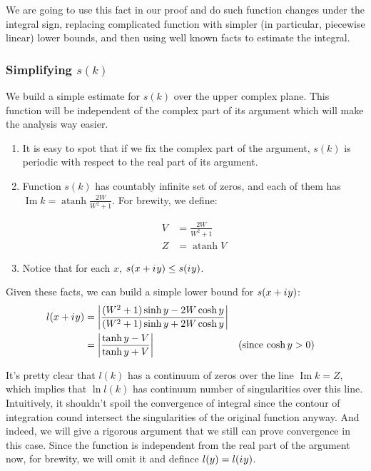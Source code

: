 \documentclass{gCOV2e}
\theoremstyle{plain}%
\theoremstyle{definition}
\theoremstyle{remark}
\newcommand{\iu}{{i\mkern1mu}} %
\renewcommand{\Im}{\operatorname{Im}}
\newcommand\abs[1]{\left|#1\right|}
\DeclareMathOperator\atanh{atanh}
\begin{document}
We are going to use this fact in our proof and do such function changes under the integral sign, replacing complicated function with simpler (in particular, piecewise linear) lower bounds, and then using well known facts to estimate the integral.

\subsubsection{Simplifying $s(k)$}
We build a simple estimate for $s(k)$ over the upper complex plane. This function will be independent of the complex part of its argument which will make the analysis way easier.

\begin{enumerate}
\item
  It is easy to spot that if we fix the complex part of the argument, $s(k)$ is periodic with respect to the real part of its argument.
\item 
  Function $s(k)$ has countably infinite set of zeros, and each of them has $\Im k = \atanh \frac{2 W}{W^2 + 1}$. For brewity, we define:

  \begin{equation*}
  \begin{aligned}
     V &= \frac{2 W}{W^2 + 1}
  \\ Z &= \atanh V
  \end{aligned}
  \end{equation*}
\item
  Notice that for each $x$, $s(x + \iu y) \le s(\iu y)$.
\end{enumerate}

Given these facts, we can build a simple lower bound for $s(x + \iu y)$:
\begin{align*}
l(x + \iu y)
   &= \abs{\frac{(W^2 + 1) \sinh y - 2 W \cosh y}{(W^2 + 1) \sinh y + 2 W \cosh y}}
\\ &= \abs{\frac{\tanh y - V}{\tanh y + V}} && \text{(since $\cosh y > 0$)}
\end{align*}

It's pretty clear that $l(k)$ has a continuum of zeros over the line $\Im k = Z$, which implies that $\ln l(k)$ has continuum number of singularities over this line. Intuitively, it shouldn't spoil the convergence of integral since the contour of integration cound intersect the singularities of the original function anyway. And indeed, we will give a rigorous argument that we still can prove convergence in this case. Since the function is independent from the real part of the argument now, for brewity, we will omit it and defince $l(y) = l(\iu y)$.
\end{document}
